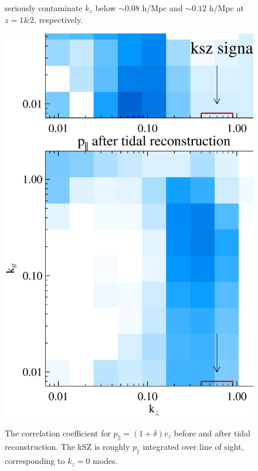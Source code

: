 \begin{figure}[btp]
\begin{minipage}[t]{0.33\linewidth}
{    seriously contaminate $k_z$ below $\sim0.08$ h/Mpc and $\sim0.12$ h/Mpc 
    at $z=1\&2$, respectively. }
\label{fig:v}
\end{minipage}
\begin{minipage}[t]{0.33\linewidth}
\begin{center}
\includegraphics[width=\textwidth,height=1.7\textwidth]{figure/powmomen_before_after_tide.eps}
\end{center}
\vspace{-0.7cm}
\label{fig:p}
\caption{The correlation coefficient for $p_\parallel=(1+\delta)v_z$ before and 
after tidal reconstruction. 
The kSZ is roughly $p_\parallel$ integrated over line of sight, 
corresponding to $k_z=0$ modes.}
\end{minipage}
\end{figure}
